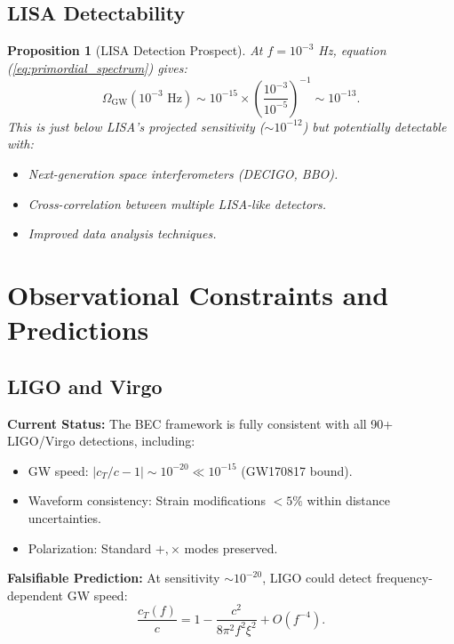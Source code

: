 \documentclass[11pt,a4paper]{article}
\newcommand{\cT}{\ensuremath{c_T}}
\newtheorem{proposition}[theorem]{Proposition}
\theoremstyle{definition}
\theoremstyle{remark}
\begin{document}
\subsection{LISA Detectability}
\label{sec:lisa_primordial}

\begin{proposition}[LISA Detection Prospect]
At $f = 10^{-3}$ Hz, equation (\ref{eq:primordial_spectrum}) gives:
\begin{equation}
\Omega_{\mathrm{GW}}(10^{-3} \text{ Hz}) \sim 10^{-15}\times\left(\frac{10^{-3}}{10^{-5}}\right)^{-1} \sim 10^{-13}.
\end{equation}
This is just below LISA's projected sensitivity ($\sim 10^{-12}$) but potentially detectable with:
\begin{itemize}
\item Next-generation space interferometers (DECIGO, BBO).
\item Cross-correlation between multiple LISA-like detectors.
\item Improved data analysis techniques.
\end{itemize}
\end{proposition}

\section{Observational Constraints and Predictions}
\label{sec:observations}

\subsection{LIGO and Virgo}
\label{sec:ligo_virgo}

\textbf{Current Status:} The BEC framework is fully consistent with all 90+ LIGO/Virgo detections, including:
\begin{itemize}
\item GW speed: $|\cT/c - 1| \sim 10^{-20} \ll 10^{-15}$ (GW170817 bound).
\item Waveform consistency: Strain modifications $<5\%$ within distance uncertainties.
\item Polarization: Standard $+,\times$ modes preserved.
\end{itemize}

\textbf{Falsifiable Prediction:} At sensitivity $\sim 10^{-20}$, LIGO could detect frequency-dependent GW speed:
\begin{equation}
\frac{\cT(f)}{c} = 1 - \frac{c^2}{8\pi^2 f^2\xi^2} + O(f^{-4}).
\end{equation}
\end{document}
